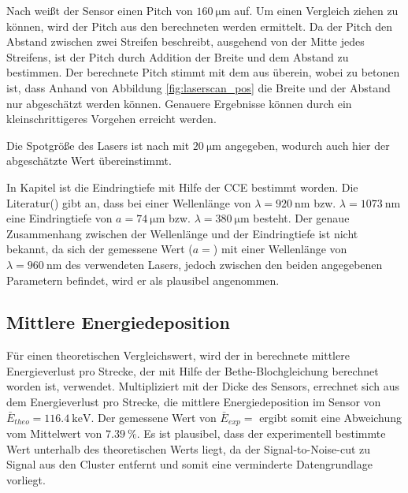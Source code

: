 Nach \cite{skript} weißt der Sensor einen Pitch von $\SI{160}{\micro\meter}$ auf. Um einen Vergleich ziehen zu können, wird der Pitch aus den berechneten werden ermittelt. Da der Pitch den Abstand zwischen zwei Streifen beschreibt, ausgehend von der Mitte jedes Streifens, ist der Pitch durch Addition der Breite und dem Abstand zu bestimmen. Der berechnete Pitch stimmt mit dem aus \cite{skript} überein, wobei zu betonen ist, dass Anhand von Abbildung \ref{fig:laserscan_pos} die Breite und der Abstand nur abgeschätzt werden können. Genauere Ergebnisse können durch ein kleinschrittigeres Vorgehen erreicht werden.

Die Spotgröße des Lasers ist nach \cite{skript} mit $\SI{20}{\micro\meter}$ angegeben, wodurch auch hier der abgeschätzte Wert übereinstimmt.

In Kapitel \label{sec:CCE} ist die Eindringtiefe mit Hilfe der CCE bestimmt worden. Die Literatur(\cite{skript}) gibt an, dass bei einer Wellenlänge von $\lambda=\SI{920}{\nano\meter}$ bzw. $\lambda=\SI{1073}{\nano\meter}$ eine Eindringtiefe von $a=\SI{74}{\micro\meter}$ bzw. $\lambda=\SI{380}{\micro\meter}$ besteht. Der genaue Zusammenhang zwischen der Wellenlänge und der Eindringtiefe ist nicht bekannt,  da sich der gemessene Wert ($a= $) mit einer Wellenlänge von $\lambda=\SI{960}{\nano\meter}$ des verwendeten Lasers, jedoch zwischen den beiden angegebenen Parametern befindet, wird er als plausibel angenommen.


\subsection{Mittlere Energiedeposition}
Für einen theoretischen Vergleichswert, wird der in \cite{skript} berechnete mittlere Energieverlust pro Strecke, der mit Hilfe der Bethe-Blochgleichung berechnet worden ist, verwendet. Multipliziert mit der Dicke des Sensors, errechnet sich aus dem Energieverlust pro Strecke, die mittlere Energiedeposition im Sensor von $\bar{E}_{theo}=\SI{116.4}{\kilo\eV}$. Der gemessene Wert von $\bar{E}_{exp}= $ ergibt somit eine Abweichung vom Mittelwert von $\SI{7.39}{\percent}$. Es ist plausibel, dass der experimentell bestimmte Wert unterhalb des theoretischen Werts liegt, da der Signal-to-Noise-cut zu Signal aus den Cluster entfernt und somit eine verminderte Datengrundlage vorliegt.
